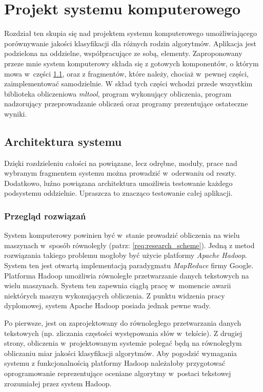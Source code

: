 \documentclass[../thesis.tex]{subfiles}
\begin{document}
\pagestyle{plain}

\chapter{Projekt systemu komputerowego}

Rozdział ten skupia się nad projektem systemu komputerowego umożliwiającego porównywanie jakości klasyfikacji dla różnych rodzin algorytmów. Aplikacja jest podzielona na oddzielne, współpracujące ze sobą, elementy. Zaproponowany przeze mnie system komputerowy składa się z gotowych komponentów, o którym mowa w~części \ref{proj:arch}, oraz z fragmentów, które należy, chociaż w~pewnej części, zaimplementować samodzielnie. W skład tych części wchodzi przede wszystkim biblioteka obliczeniowa \emph{mltool}, program wykonujący obliczenia, program nadzorujący przeprowadzanie obliczeń oraz programy prezentujące ostateczne wyniki.

\section{Architektura systemu}
\label{proj:arch}

Dzięki rozdzieleniu całości na powiązane, lecz odrębne, moduły, prace nad wybranym fragmentem systemu można prowadzić w~oderwaniu od reszty. Dodatkowo, luźno powiązana architektura umożliwia testowanie każdego podsystemu oddzielnie. Upraszcza to znacząco testowanie całej aplikacji.

\subsection{Przegląd rozwiązań}

System komputerowy powinien być w~stanie prowadzić obliczenia na wielu maszynach w~sposób równoległy (patrz: \ref{req:research_scheme}). Jedną z metod rozwiązania takiego problemu mogłoby być użycie platformy \emph{Apache Hadoop}. System ten jest otwartą implementacją paradygmatu \emph{MapReduce} firmy Google. Platforma Hadoop umożliwia równoległe przetwarzanie danych tekstowych na wielu maszynach. System ten zapewnia ciągłą pracę w~momencie awarii niektórych maszyn wykonujących obliczenia. Z punktu widzenia pracy dyplomowej, system Apache Hadoop posiada jednak pewne wady. 

Po pierwsze, jest on zaprojektowany do równoległego przetwarzania danych tekstowych (np. zliczania częstości występowania słów w~tekście). Z drugiej strony, obliczenia w~projektowanym systemie polegać będą na równoległym obliczaniu miar jakości klasyfikacji algorytmów. Aby pogodzić wymagania systemu z funkcjonalnością platformy Hadoop należałoby przygotować oprogramowanie reprezentujące oceniane algorytmy w~postaci tekstowej zrozumiałej przez system Hadoop. 
\end{document}
